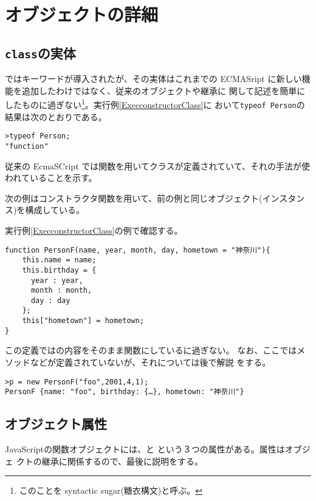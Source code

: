 \chapter{オブジェクトの詳細}
\section{\protect\texttt{class}の実体}
\ES ではキーワードが導入されたが、その実体はこれまでの
ECMASript に新しい機能を追加したわけではなく、従来のオブジェクトや継承に
関して記述を簡単にしたものに過ぎない\footnote{このことを syntactic
sugar(糖衣構文)と呼ぶ。}。実行例\ref{ExecconstructorClass}に
おいて\texttt{typeof Person}の結果は次のとおりである。
\begin{Verbatim}
>typeof Person;
"function"
\end{Verbatim}
従来の EcmaSCript では関数を用いてクラスが定義されていて、それの手法が使
われていることを示す。
\begin{Exec}\label{constructor}\upshape
次の例はコンストラクタ関数を用いて、前の例と同じオブジェクト(インスタン
 ス)を構成している。

 実行例\ref{ExecconstructorClass}の例で確認する。
\begin{Verbatim}
function PersonF(name, year, month, day, hometown = "神奈川"){
    this.name = name;
    this.birthday = {
      year : year,
      month : month,
      day : day
    };
    this["hometown"] = hometown;
}
\end{Verbatim}
 この定義ではの内容をそのまま関数にしているに過ぎない。
 なお、ここではメソッドなどが定義されていないが、それについては後で解説
 をする。
 \end{Exec}
\begin{Verbatim}
>p = new PersonF("foo",2001,4,1);
PersonF {name: "foo", birthday: {…}, hometown: "神奈川"}
\end{Verbatim}
\section{オブジェクト属性}
JavaScriptの関数オブジェクトには、と
という３つの属性がある。属性はオブジェ
クトの継承に関係するので、最後に説明をする。
